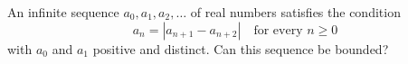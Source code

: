 An infinite sequence $a_0, a_1, a_2, \ldots$ of real numbers satisfies the condition
\[ a_n = |a_{n+1} - a_{n+2}| \quad \text{for every } n \geq 0 \]
with $a_0$ and $a_1$ positive and distinct. Can this sequence be bounded?
